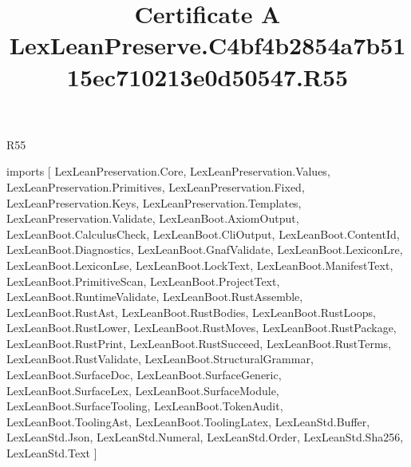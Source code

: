 \begin{lexlean}{R55}
\title{Certificate A LexLeanPreserve.C4bf4b2854a7b5115ec710213e0d50547.R55}
\begin{coremodule}
imports [
  LexLeanPreservation.Core,
  LexLeanPreservation.Values,
  LexLeanPreservation.Primitives,
  LexLeanPreservation.Fixed,
  LexLeanPreservation.Keys,
  LexLeanPreservation.Templates,
  LexLeanPreservation.Validate,
  LexLeanBoot.AxiomOutput,
  LexLeanBoot.CalculusCheck,
  LexLeanBoot.CliOutput,
  LexLeanBoot.ContentId,
  LexLeanBoot.Diagnostics,
  LexLeanBoot.GnafValidate,
  LexLeanBoot.LexiconLre,
  LexLeanBoot.LexiconLse,
  LexLeanBoot.LockText,
  LexLeanBoot.ManifestText,
  LexLeanBoot.PrimitiveScan,
  LexLeanBoot.ProjectText,
  LexLeanBoot.RuntimeValidate,
  LexLeanBoot.RustAssemble,
  LexLeanBoot.RustAst,
  LexLeanBoot.RustBodies,
  LexLeanBoot.RustLoops,
  LexLeanBoot.RustLower,
  LexLeanBoot.RustMoves,
  LexLeanBoot.RustPackage,
  LexLeanBoot.RustPrint,
  LexLeanBoot.RustSucceed,
  LexLeanBoot.RustTerms,
  LexLeanBoot.RustValidate,
  LexLeanBoot.StructuralGrammar,
  LexLeanBoot.SurfaceDoc,
  LexLeanBoot.SurfaceGeneric,
  LexLeanBoot.SurfaceLex,
  LexLeanBoot.SurfaceModule,
  LexLeanBoot.SurfaceTooling,
  LexLeanBoot.TokenAudit,
  LexLeanBoot.ToolingAst,
  LexLeanBoot.ToolingLatex,
  LexLeanStd.Buffer,
  LexLeanStd.Json,
  LexLeanStd.Numeral,
  LexLeanStd.Order,
  LexLeanStd.Sha256,
  LexLeanStd.Text
]


\end{coremodule}
\end{lexlean}
